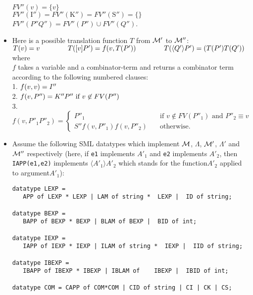 \documentclass[11pt]{article}
\newcommand \cI {\mbox{I}''}
\newcommand \cK {\mbox{K}''}
\newcommand \mycS {\mbox{S}''}
\begin{document}
\begin{itemize}
	      $FV''(v) = \{v\}$\\
	      $FV''(\cI) = FV''(\cK) = FV''(\mycS) = \{\}$\\ $FV''(P''Q'') = FV''(P'')\cup FV''(Q'')$.
	\item
	      Here is a possible translation function $T$ from ${\cal M}'$ to ${\cal M}''$:\\
	      $T(v) = v      \hspace{0.5in} \: \: T([v]P') = f(v, T(P'))  \: \: \hspace{0.5in}  T(\langle Q' \rangle P') = (T(P')T(Q'))$ where\\
	      $f$ takes a variable and a combinator-term and returns a combinator term according to the following numbered clauses:\\
	      1. $f(v,v) = I''   \hspace{0.5in}   \: \:$\\  2. $f(v,P'')=  K''P''  \mbox{  if $v \not \in FV(P'')$}   \: \:  \hspace{0.5in} $\\
	      3. $f(v,P''_1P''_2)=  \begin{cases}
	      P''_1 &\quad\mbox{if $v \not \in FV(P''_1)$ and $P''_2 \equiv v$}\\
	      S''f(v,P''_1)f(v,P''_2) & \quad\mbox{otherwise.} 
	\end{cases}$
	\item
	      Assume the following SML  datatypes which implement ${\cal M}$, $\Lambda$, ${\cal M}'$, $\Lambda'$ and ${\cal M}''$ respectively (here, if \texttt{e1} implements $A'_1$ and \texttt{e2} implements $A'_2$, then 
	      \texttt{IAPP(e1,e2)} implements $\langle A'_1\rangle A'_2$ which  stands for the function$A'_2$ applied to argument$A'_1$):
	      \begin{verbatim}
datatype LEXP =  
   APP of LEXP * LEXP | LAM of string *  LEXP |  ID of string;

datatype BEXP =  
   BAPP of BEXP * BEXP | BLAM of BEXP |  BID of int;

datatype IEXP =  
   IAPP of IEXP * IEXP | ILAM of string *  IEXP |  IID of string;

datatype IBEXP =  
   IBAPP of IBEXP * IBEXP | IBLAM of    IBEXP |  IBID of int;

datatype COM = CAPP of COM*COM | CID of string | CI | CK | CS;
	      \end{verbatim}
\end{itemize}
\end{document}
